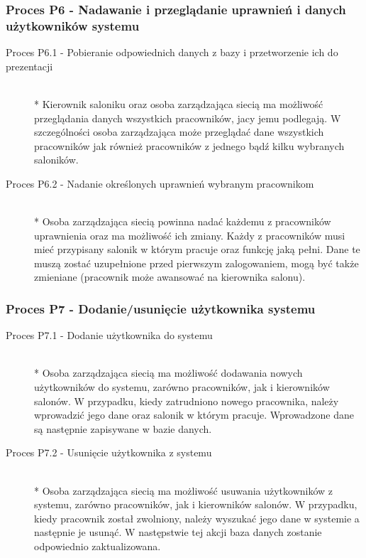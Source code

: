 \subsubsection{Proces P6 - Nadawanie i przeglądanie uprawnień i danych użytkowników systemu}
\begin{description}
\item[Proces P6.1 - Pobieranie odpowiednich danych z bazy i przetworzenie ich do prezentacji] ~\\*
Kierownik saloniku oraz osoba zarządzająca siecią ma możliwość przeglądania danych wszystkich pracowników, jacy jemu podlegają. W szczególności osoba zarządzająca może przeglądać dane wszystkich pracowników jak również pracowników z jednego bądź kilku wybranych saloników.
\item[Proces P6.2 - Nadanie określonych uprawnień wybranym pracownikom] ~\\*
Osoba zarządzająca siecią powinna nadać każdemu z pracowników uprawnienia oraz ma możliwość ich zmiany. Każdy z pracowników musi mieć przypisany salonik w którym pracuje oraz funkcję jaką pełni. Dane te muszą zostać uzupełnione przed pierwszym zalogowaniem, mogą być także zmieniane (pracownik może awansować na kierownika salonu).
\end{description}
\subsubsection{Proces P7 - Dodanie/usunięcie użytkownika systemu}
\begin{description}
\item[Proces P7.1 - Dodanie użytkownika do systemu] ~\\*
Osoba zarządzająca siecią ma możliwość dodawania nowych użytkowników do systemu, zarówno pracowników, jak i kierowników salonów. W przypadku, kiedy zatrudniono nowego pracownika, należy wprowadzić jego dane oraz salonik w którym pracuje. Wprowadzone dane są następnie zapisywane w bazie danych.
\item[Proces P7.2 - Usunięcie użytkownika z systemu] ~\\*
Osoba zarządzająca siecią ma możliwość usuwania użytkowników z systemu, zarówno pracowników, jak i kierowników salonów. W przypadku, kiedy pracownik został zwolniony, należy wyszukać jego dane w systemie a następnie je usunąć. W następstwie tej akcji baza danych zostanie odpowiednio zaktualizowana.
\end{description}
